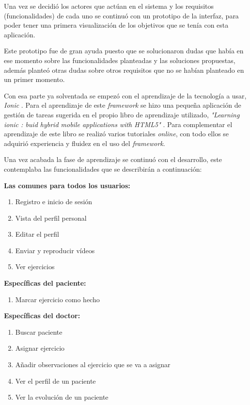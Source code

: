 \medskip
Una vez se decidió los actores que actúan en el sistema y los requisitos (funcionalidades) de cada uno
se continuó con un prototipo de la interfaz, para poder tener una primera visualización de los objetivos
que se tenía con esta aplicación.

\medskip
Este prototipo fue de gran ayuda puesto que se solucionaron dudas que había en ese momento sobre
las funcionalidades planteadas y las soluciones propuestas, además planteó otras dudas sobre otros requisitos
que no se habían planteado en un primer momento.

\medskip
Con esa parte ya solventada se empezó con el aprendizaje de la tecnología a usar, \textit{Ionic} \cite{ionic}.
Para el aprendizaje de este \textit{framework} se hizo una pequeña aplicación de gestión de tareas
sugerida en el propio libro de aprendizaje utilizado, \textit{"Learning ionic : buid hybrid mobile
applications with HTML5"} \cite{ionic-book}. Para complementar el aprendizaje de este libro se realizó
varios tutoriales \textit{online}, con todo ellos se adquirió experiencia y fluidez en el uso del
\textit{framework}.

\medskip
Una vez acabada la fase de aprendizaje se continuó con el desarrollo, este contemplaba las funcionalidades
que se describirán a continuación:

\medskip
\textbf{Las comunes para todos los usuarios:}
\begin{enumerate}
    \item Registro e inicio de sesión
    \item Vista del perfil personal
    \item Editar el perfil
    \item Enviar y reproducir vídeos
    \item Ver ejercicios
\end{enumerate}

\medskip
\textbf{Específicas del paciente:}
\begin{enumerate}
    \item Marcar ejercicio como hecho
\end{enumerate}

\medskip
\textbf{Específicas del doctor:}
\begin{enumerate}
    \item Buscar paciente
    \item Asignar ejercicio
    \item Añadir observaciones al ejercicio que se va a asignar
    \item Ver el perfil de un paciente
    \item Ver la evolución de un paciente
\end{enumerate}


